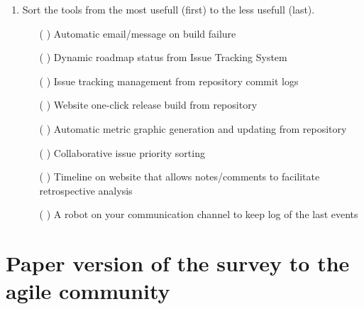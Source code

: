 \documentclass[lnbip]{svmultln}
\begin{document}
\begin{enumerate}
\item Sort the tools from the most usefull (first) to the less usefull
  (last).
  \begin{itemize}
  \item[( ) ] Automatic email/message on build failure
  \item[( ) ] Dynamic roadmap status from Issue Tracking System
  \item[( ) ] Issue tracking management from repository commit logs
  \item[( ) ] Website one-click release build from repository
  \item[( ) ] Automatic metric graphic generation and updating from
    repository
  \item[( ) ] Collaborative issue priority sorting
  \item[( ) ] Timeline on website that allows notes/comments to
    facilitate retrospective analysis
  \item[( ) ] A robot on your communication channel to keep log of the
    last events
  \end{itemize}
\end{enumerate}

\section{Paper version of the survey to the agile community}
\label{appendix:b}
\end{document}
